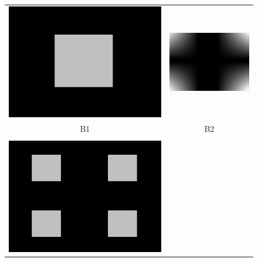 \documentclass[a4paper,twocolumn]{article}
\begin{document}
	\begin{figure} [t]
		\centering
		\begin{tabular}{c c}
			\includegraphics[width=0.8\columnwidth]{figures/B1.png}
			&
			\includegraphics[width=0.8\columnwidth]{figures/B2.png}\\
			B1 & B2\\
			& \\
			\includegraphics[width=0.8\columnwidth]{figures/B1_ext.png}

\end{tabular}
\end{figure}
\end{document}
